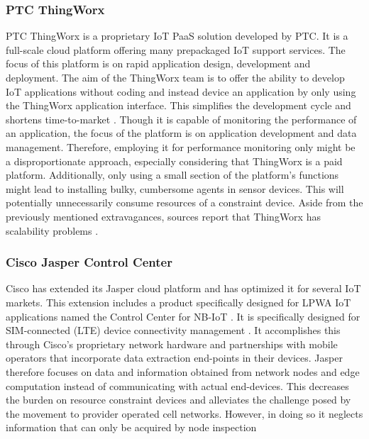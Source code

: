 \subsubsection*{PTC ThingWorx}
PTC ThingWorx \cite{web:thingworx} is a proprietary IoT PaaS solution developed by PTC. It is a full-scale cloud platform offering many prepackaged IoT support services. The focus of this platform is on rapid application design, development and deployment. The aim of the ThingWorx team is to offer the ability to develop IoT applications without coding and instead device an application by only using the ThingWorx application interface. This simplifies the development cycle and shortens time-to-market \cite{study_of_various}. Though it is capable of monitoring the performance of an application, the focus of the platform is on application development and data management. Therefore, employing it for performance monitoring only might be a disproportionate approach, especially considering that ThingWorx is a paid platform. Additionally, only using a small section of the platform's functions might lead to installing bulky, cumbersome agents in sensor devices. This will potentially unnecessarily consume resources of a constraint device. Aside from the previously mentioned extravagances, sources report that ThingWorx has scalability problems \cite{good_assessment}.%

\subsubsection*{Cisco Jasper Control Center}
Cisco has extended its Jasper cloud platform and has optimized it for several IoT markets. This extension includes a product specifically designed for LPWA IoT applications named the Control Center for NB-IoT \cite{cisco_jasper}. It is specifically designed for SIM-connected (LTE) device connectivity management \cite{forrester}. It accomplishes this through Cisco's proprietary network hardware and partnerships with mobile operators that incorporate data extraction end-points in their devices. Jasper therefore focuses on data and information obtained from network nodes and edge computation instead of communicating with actual end-devices. This decreases the burden on resource constraint devices and alleviates the challenge posed by the movement to provider operated cell networks. However, in doing so it neglects information that can only be acquired by node inspection

